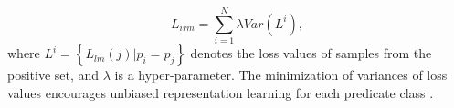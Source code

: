 \documentclass[letterpaper]{article} %
\begin{document}
\begin{equation}
\label{eq:irm}
    L_{irm}=\sum_{i=1}^{N}\lambda Var(L^{i} ),
\end{equation}
where $ L^i=\left\{L_{lm}\left(j\right)|p_i=p_j\right\} $ denotes the loss values of samples from the positive set, and $ \lambda $ is a hyper-parameter. The minimization of variances of loss values encourages unbiased representation learning for each predicate class \cite{arjovsky2020invariant}.

\end{document}
